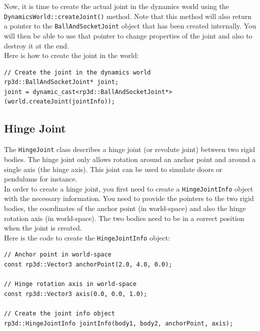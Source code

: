 \documentclass[a4paper,12pt]{article}
\begin{document}
    \vspace{0.6cm}

    Now, it is time to create the actual joint in the dynamics world using the \texttt{Dynamics\allowbreak World::createJoint()} method.
    Note that this method will also return a pointer to the \texttt{BallAndSocketJoint} object that has been created internally. You will then
    be able to use that pointer to change properties of the joint and also to destroy it at the end. \\

    Here is how to create the joint in the world: \\

    \begin{lstlisting}
// Create the joint in the dynamics world
rp3d::BallAndSocketJoint* joint;
joint = dynamic_cast<rp3d::BallAndSocketJoint*>(world.createJoint(jointInfo));
  \end{lstlisting}

    \vspace{0.6cm}

    \subsection{Hinge Joint}

    The \texttt{HingeJoint} class describes a hinge joint (or revolute joint) between two rigid bodies. The hinge joint only allows rotation around an anchor point and
    around a single axis (the hinge axis). This joint can be used to simulate doors or pendulums for instance. \\

    In order to create a hinge joint, you first need to create a \texttt{HingeJointInfo} object with the necessary information. You need to provide the pointers to the
    two rigid bodies, the coordinates of the anchor point (in world-space) and also the hinge rotation axis (in world-space). The two bodies need to be in a correct position
    when the joint is created. \\

    Here is the code to create the \texttt{HingeJointInfo} object: \\

    \begin{lstlisting}
// Anchor point in world-space
const rp3d::Vector3 anchorPoint(2.0, 4.0, 0.0);

// Hinge rotation axis in world-space
const rp3d::Vector3 axis(0.0, 0.0, 1.0);

// Create the joint info object
rp3d::HingeJointInfo jointInfo(body1, body2, anchorPoint, axis);
  \end{lstlisting}
\end{document}
